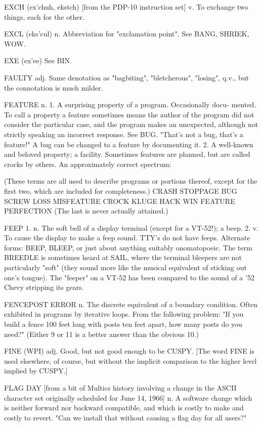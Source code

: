 EXCH (ex'chuh, ekstch) [from the PDP-10 instruction set] v. To
   exchange two things, each for the other.

EXCL (eks'cul) n. Abbreviation for "exclamation point".	 See BANG,
   SHRIEK, WOW.

EXE (ex'ee)  See BIN.

FAULTY adj. Same denotation as "bagbiting", "bletcherous", "losing",
   q.v., but the connotation is much milder.

FEATURE n. 1. A surprising property of a program.  Occasionally docu-
   mented.  To call a property a feature sometimes means the author of
   the program did not consider the particular case, and the program
   makes an unexpected, although not strictly speaking an incorrect
   response.  See BUG.	"That's not a bug, that's a feature!"  A bug
   can be changed to a feature by documenting it.  2. A well-known and
   beloved property; a facility.  Sometimes features are planned, but
   are called crocks by others.	 An approximately correct spectrum:

   (These terms are all used to describe programs or portions thereof,
   except for the first two, which are included for completeness.)
	CRASH  STOPPAGE	 BUG  SCREW  LOSS  MISFEATURE
		CROCK  KLUGE  HACK  WIN	 FEATURE  PERFECTION
   (The last is never actually attained.)

FEEP 1. n. The soft bell of a display terminal (except for a VT-52!);
   a beep.  2. v. To cause the display to make a feep sound.  TTY's do
   not have feeps.  Alternate forms: BEEP, BLEEP, or just about
   anything suitably onomatopoeic.  The term BREEDLE is sometimes
   heard at SAIL, where the terminal bleepers are not particularly
   "soft" (they sound more like the musical equivalent of sticking out
   one's tongue).  The "feeper" on a VT-52 has been compared to the
   sound of a '52 Chevy stripping its gears.

FENCEPOST ERROR n. The discrete equivalent of a boundary condition.
   Often exhibited in programs by iterative loops.  From the following
   problem: "If you build a fence 100 feet long with posts ten feet
   apart, how many posts do you need?"	(Either 9 or 11 is a better
   answer than the obvious 10.)

FINE (WPI) adj. Good, but not good enough to be CUSPY.	[The word FINE
   is used elsewhere, of course, but without the implicit comparison
   to the higher level implied by CUSPY.]

FLAG DAY [from a bit of Multics history involving a change in the
   ASCII character set originally scheduled for June 14, 1966]
   n. A software change which is neither forward nor backward
   compatible, and which is costly to make and costly to revert.
   "Can we install that without causing a flag day for all users?"

